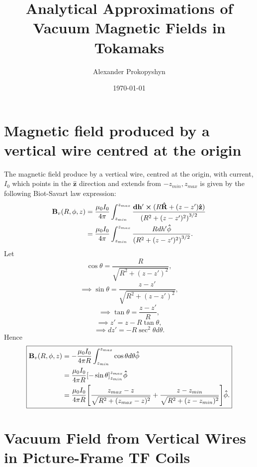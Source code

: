 \documentclass{article}
\title{Analytical Approximations of Vacuum Magnetic Fields in Tokamaks}
\author{Alexander Prokopyshyn}
\date{\today}
\let\vec\mathbf
\begin{document}
\maketitle

\section{Magnetic field produced by a vertical wire centred at the origin}
\label{sec:vertical_wire_at_origin}

The magnetic field produce by a vertical wire, centred at the origin, with current, \(I_0\) which points in the 
\(\vec{\hat{z}}\) direction and extends from \(-z_{min}, z_{max}\) is given by the following Biot-Savart law expression:
\[\begin{aligned}
    \vec{B}_{v}(R, \phi, z) &= \frac{\mu_0 I_0}{4\pi}\int_{z_{min}}^{z_{max}}\frac{\vec{dh'}\cross(R\vec{\hat{R}} + (z-z')\vec{\hat{z}})}{\qty(R^2+(z-z')^2)^{3/2}} \\
    &= \frac{\mu_0 I_0}{4\pi}\int_{z_{min}}^{z_{max}}\frac{Rdh'\vec{\hat{\phi}}}{\qty(R^2+(z-z')^2)^{3/2}}.
\end{aligned}
\]
Let
\[\cos\theta = \frac{R}{\sqrt{R^2+(z-z')^2}},\]
\[\implies \sin\theta = \frac{z-z'}{\sqrt{R^2+(z-z')^2}},\]
\[\implies \tan \theta = \frac{z-z'}{R},\]
\[\implies z' = z - R\tan\theta,\]
\[\implies dz' = -R\sec^2\theta d\theta.\]
Hence
\[
\boxed{\begin{aligned}
    \vec{B}_{v}(R, \phi, z) &= -\frac{\mu_0 I_0}{4\pi R}\int_{z_{min}}^{z_{max}}\cos\theta d\theta\vec{\hat{\phi}}\\
    &= \frac{\mu_0 I_0}{4\pi R}\qty[-\sin\theta]_{z_{min}}^{z_{max}}\vec{\hat{\phi}}\\
    &= \frac{\mu_0 I_0}{4\pi R}\qty[\frac{z_{max}-z}{\sqrt{R^2+(z_{max}-z)^2}} + \frac{z-z_{min}}{\sqrt{R^2+(z-z_{min})^2}}]\vec{\hat{\phi}}.
\end{aligned}}\]

\section{Vacuum Field from Vertical Wires in Picture-Frame TF Coils}
\end{document}
